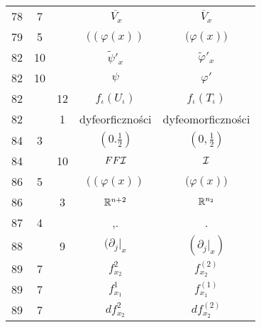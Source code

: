 \documentclass[a4paper,11pt]{article}
\begin{document}
\begin{center}
\begin{tabular}{|c|c|c|c|c|}
    78  &  7 & & $\overline{ \, V_{ x } }$
           & $\overline{ V }_{ x }$ \\
    79  &  5 & & $( ( \varphi( x ) )$ & $\big( \varphi( x ) \big)$ \\
    82  & 10 & & $\widetilde{ \psi }'_{ x }$
           & $\widetilde{ \varphi }'_{ x }$ \\
    82  & 10 & & $\psi$ & $\varphi'$ \\
    82  & & 12 & $f_{ \iota }( U_{ \iota } )$ & $f_{ \iota }( T_{ \iota } )$ \\
    82  & &  1 & dyfeorficzności & dyfeomorficzności \\
    84  &  3 & & $( 0. \frac{ 1 }{ 2 } )$ & $( 0, \frac{ 1 }{ 2 } )$ \\
    84  & & 10 & $FF\mathcal{I}$ & $\mathcal{I}$ \\
    86  &  5 & & $( ( \varphi( x ) )$ & $\big( \varphi( x ) \big)$ \\
    86  & &  3 & $\mathbb{R}^{ n + 2 }$ & $\mathbb{R}^{ n_{ 2 } }$ \\
    87  &  4 & & ,. & . \\
    88  & &  9 & $( \partial_{ j }|_{ x }$ & $( \partial_{ j }|_{ x } )$ \\
    89  &  7 & & $f_{ x_{ 2 } }^{ 2 }$ & $f_{ x_{ 2 } }^{ ( 2 ) }$ \\
    89  &  7 & & $f_{ x_{ 1 } }^{ 1 }$ & $f_{ x_{ 1 } }^{ ( 1 ) }$ \\
    89  &  7 & & $d f_{ x_{ 2 } }^{ 2 }$ & $d f_{ x_{ 2 } }^{ ( 2 ) }$ \\
    \hline
  \end{tabular}






\end{center}
\end{document}

